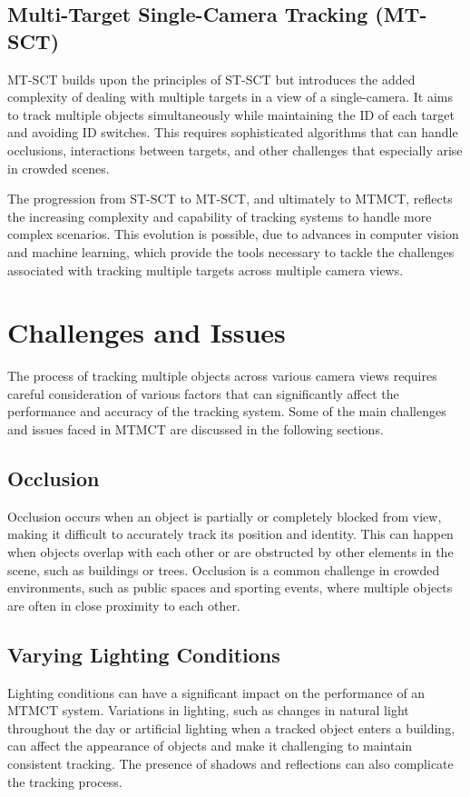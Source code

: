 \subsection{Multi-Target Single-Camera Tracking (MT-SCT)}
MT-SCT builds upon the principles of ST-SCT but introduces the added complexity of dealing with multiple targets in a view of a single-camera. It aims to track multiple objects simultaneously while maintaining the ID of each target and avoiding ID switches. This requires sophisticated algorithms that can handle occlusions, interactions between targets, and other challenges that especially arise in crowded scenes.

The progression from ST-SCT to MT-SCT, and ultimately to MTMCT, reflects the increasing complexity and capability of tracking systems to handle more complex scenarios. This evolution is possible, due to advances in computer vision and machine learning, which provide the tools necessary to tackle the challenges associated with tracking multiple targets across multiple camera views.

\section{Challenges and Issues}\label{sec:challenges_and_issues}
The process of tracking multiple objects across various camera views requires careful consideration of various factors that can significantly affect the performance and accuracy of the tracking system. Some of the main challenges and issues faced in MTMCT are discussed in the following sections.

\subsection{Occlusion}\label{subsec:occlusion}
Occlusion occurs when an object is partially or completely blocked from view, making it difficult to accurately track its position and identity. This can happen when objects overlap with each other or are obstructed by other elements in the scene, such as buildings or trees. Occlusion is a common challenge in crowded environments, such as public spaces and sporting events, where multiple objects are often in close proximity to each other.

\subsection{Varying Lighting Conditions}\label{subsec:varying_lighting_conditions}
Lighting conditions can have a significant impact on the performance of an MTMCT system. Variations in lighting, such as changes in natural light throughout the day or artificial lighting when a tracked object enters a building, can affect the appearance of objects and make it challenging to maintain consistent tracking. The presence of shadows and reflections can also complicate the tracking process.

